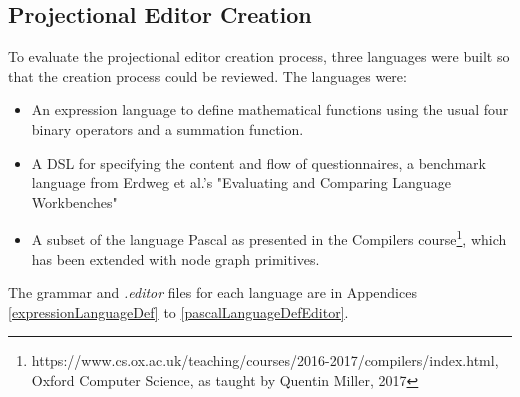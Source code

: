 \documentclass{article}
\begin{document}
{\subsection{Projectional Editor Creation}\label{creationEvaluation}
To evaluate the projectional editor creation process, three languages were built so that the creation process could be reviewed. The languages were:
\begin{itemize}
\item An expression language to define mathematical functions using the usual four binary operators and a summation function.
\item A DSL for specifying the content and flow of questionnaires, a benchmark language from Erdweg et al.'s "Evaluating and Comparing Language Workbenches"~\cite{languageWorkbenchChallenge}
\item A subset of the language Pascal as presented in the Compilers course\footnote{https://www.cs.ox.ac.uk/teaching/courses/2016-2017/compilers/index.html, Oxford Computer Science, as taught by Quentin Miller, 2017}, which has been extended with node graph primitives. 
\end{itemize}
The grammar and \emph{.editor} files for each language are in Appendices \ref{expressionLanguageDef} to \ref{pascalLanguageDefEditor}.
%
\newpage
}
\end{document}
